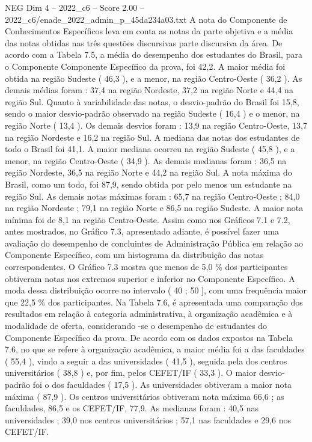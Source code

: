 \begin{textsample}{NEG Dim 4 – 2022\_c6 – Score 2.00 – 2022\_c6/enade\_2022\_admin\_p\_45da234a03.txt}
A nota do Componente de Conhecimentos Específicos leva em conta as notas da parte objetiva e a média das notas obtidas nas três questões discursivas parte discursiva da área.
De acordo com a Tabela 7.5, a média do desempenho dos estudantes do Brasil, para o Componente Componente Específico da prova, foi 42,2.
A maior média foi obtida na região Sudeste ( 46,3 ), e a menor, na região Centro-Oeste ( 36,2 ).
As demais médias foram : 37,4 na região Nordeste, 37,2 na região Norte e 44,4 na região Sul.
Quanto à variabilidade das notas, o desvio-padrão do Brasil foi 15,8, sendo o maior desvio-padrão observado na região Sudeste ( 16,4 ) e o menor, na região Norte ( 13,4 ).
Os demais desvios foram : 13,9 na região Centro-Oeste, 13,7 na região Nordeste e 16,2 na região Sul.
A mediana das notas dos estudantes de todo o Brasil foi 41,1.
A maior mediana ocorreu na região Sudeste ( 45,8 ), e a menor, na região Centro-Oeste ( 34,9 ).
As demais medianas foram : 36,5 na região Nordeste, 36,5 na região Norte e 44,2 na região Sul.
A nota máxima do Brasil, como um todo, foi 87,9, sendo obtida por pelo menos um estudante na região Sul.
As demais notas máximas foram : 65,7 na região Centro-Oeste ; 84,0 na região Nordeste ; 79,1 na região Norte e 86,5 na região Sudeste.
A maior nota mínima foi de 8,1 na região Centro-Oeste.
Assim como nos Gráficos 7.1 e 7.2, antes mostrados, no Gráfico 7.3, apresentado adiante, é possível fazer uma avaliação do desempenho de concluintes de Administração Pública em relação ao Componente Específico, com um histograma da distribuição das notas correspondentes.
O Gráfico 7.3 mostra que menos de 5,0 \% dos participantes obtiveram notas nos extremos superior e inferior no Componente Específico.
A moda dessa distribuição ocorre no intervalo ( 40 ; 50 ], com uma frequência maior que 22,5 \% dos participantes.
Na Tabela 7.6, é apresentada uma comparação dos resultados em relação à categoria administrativa, à organização acadêmica e à modalidade de oferta, considerando -se o desempenho de estudantes do Componente Específico da prova.
De acordo com os dados expostos na Tabela 7.6, no que se refere à organização acadêmica, a maior média foi a das faculdades ( 55,4 ), vindo a seguir a das universidades ( 41,5 ), seguida pela dos centros universitários ( 38,8 ) e, por fim, pelos CEFET/IF ( 33,3 ).
O maior desvio-padrão foi o dos faculdades ( 17,5 ).
As universidades obtiveram a maior nota máxima ( 87,9 ).
Os centros universitários obtiveram nota máxima 66,6 ; as faculdades, 86,5 e os CEFET/IF, 77,9.
As medianas foram : 40,5 nas universidades ; 39,0 nos centros universitários ; 57,1 nas faculdades e 29,6 nos CEFET/IF.

\end{textsample}
